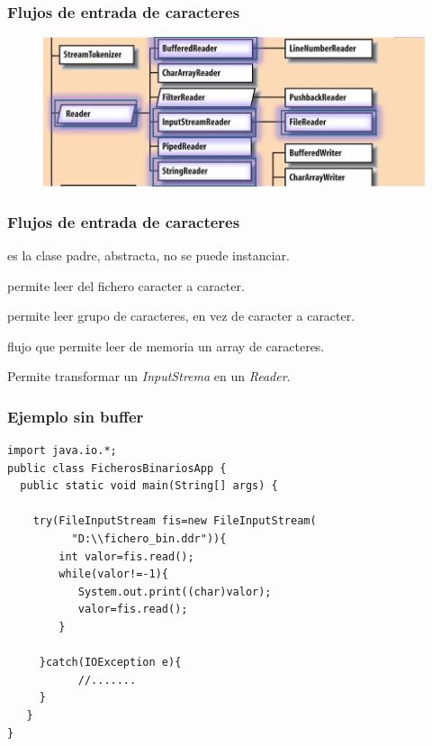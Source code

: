 \documentclass{beamer}
\begin{document}
\begin{frame}
\frametitle{Flujos de entrada de caracteres}
\begin{figure}
\includegraphics[scale=0.5]{imagenes/flujoEntradaCaracter.png}
\end{figure}
\end{frame}

\begin{frame}[fragile]
\frametitle{Flujos de entrada de caracteres}
\begin{description}[<+->]
\item[Reader] es la clase padre, abstracta, no se puede instanciar.
\item[FileReader] permite leer del fichero caracter a caracter.
\item[BufferedReader] permite leer grupo de caracteres, en vez de caracter a caracter.
\item[StringReader] flujo que permite leer de memoria un array de caracteres.
\item[InputStreamReader] Permite transformar un \emph{InputStrema} en un \emph{Reader}.

\end{description}
\pause
\end{frame}

\begin{frame}[fragile]
\frametitle{Ejemplo sin buffer}
\begin{verbatim}
import java.io.*;
public class FicherosBinariosApp {
  public static void main(String[] args) {
 
    try(FileInputStream fis=new FileInputStream(
          "D:\\fichero_bin.ddr")){
        int valor=fis.read();
        while(valor!=-1){
           System.out.print((char)valor);
           valor=fis.read();
        }
 
     }catch(IOException e){
           //....... 
     }
   }
}
\end{verbatim}
\end{frame}
\end{document}
